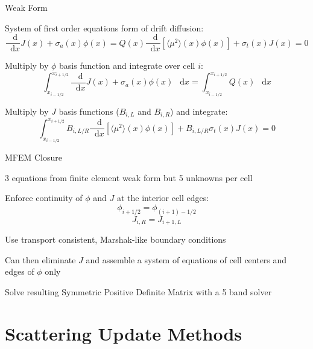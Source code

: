 \documentclass[10pt]{beamer}
\newcommand{\ud}{\mathop{}\!\mathrm{d}} %
\newcommand{\dderiv}[2]{\frac{\ud #1}{\ud #2}}
\newcommand{\edd}{\langle \mu^2 \rangle}
\newcommand{\bracket}[1]{\left[ #1 \right]}
\begin{document}
\begin{frame}{Weak Form}

	System of first order equations form of drift diffusion:
	\begin{subequations} 
	\begin{equation*} \label{eq:zero}
		\dderiv{}{x} J (x) + \sigma_a(x) \phi(x) = Q(x)
	\end{equation*} 
	\begin{equation*} \label{eq:first}
		\dderiv{}{x} \bracket{\edd(x) \phi (x)} + \sigma_t(x) J(x) = 0
	\end{equation*}
	\end{subequations}

	Multiply by $\phi$ basis function and integrate over cell $i$: 
	\begin{equation*}
		\int_{x_{i-1/2}}^{x_{i+1/2}} \dderiv{}{x} J (x) + \sigma_a(x) \phi(x) \ \ud x 
		= \int_{x_{i-1/2}}^{x_{i+1/2}} Q(x) \ \ud x
	\end{equation*}

	Multiply by $J$ basis functions ($B_{i,L}$ and $B_{i,R}$) and integrate: 
	\begin{equation*}
		\int_{x_{i-1/2}}^{x_{i+1/2}} 
		B_{i,L/R}\dderiv{}{x} \bracket{\edd(x) \phi (x)} + B_{i,L/R}\sigma_t(x) J(x) = 0
	\end{equation*}

\end{frame}

\begin{frame}{MFEM Closure}
	
	3 equations from finite element weak form but 5 unknowns per cell 

	Enforce continuity of $\phi$ and $J$ at the interior cell edges:
	\begin{equation*}
		\phi_{i+1/2} = \phi_{(i+1)-1/2}
	\end{equation*}
	\begin{equation*}
		J_{i,R} = J_{i+1,L}
	\end{equation*}

	Use transport consistent, Marshak-like boundary conditions
	
	Can then eliminate $J$ and assemble a system of equations of cell centers and edges of $\phi$ only 

	Solve resulting Symmetric Positive Definite Matrix with a 5 band solver  

\end{frame}

\section{Scattering Update Methods}
\end{document}
